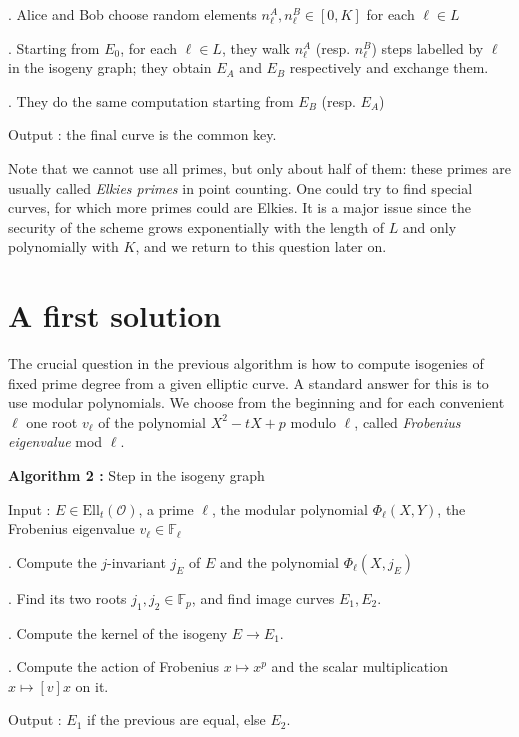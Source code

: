 \documentclass[12pt]{article}
\newcommand{\F}{\mathbb{F}}
\renewcommand{\O}{\mathcal{O}}
\newcommand{\Ell}{\mathrm{Ell}}
\begin{document}
. Alice and Bob choose random elements $n_\ell^A, n_\ell^B\in [0, K]$ for each $\ell\in L$

. Starting from $E_0$, for each $\ell\in L$, they walk $n_\ell^A$ (resp. $n_\ell^B$) steps labelled by $\ell$ in the isogeny graph; they obtain $E_A$ and $E_B$ respectively and exchange them.

. They do the same computation starting from $E_B$ (resp. $E_A$)

\noindent
Output : the final curve is the common key.
\vspace{2mm}

Note that we cannot use all primes, but only about half of them: these primes are usually called \emph{Elkies primes} in point counting. One could try to find special curves, for which more primes could are Elkies. It is a major issue since the security of the scheme grows exponentially with the length of $L$ and only polynomially with $K$, and we return to this question later on.

\section{A first solution}

The crucial question in the previous algorithm is how to compute isogenies of fixed prime degree from a given elliptic curve. A standard answer for this is to use modular polynomials. We choose from the beginning and for each convenient $\ell$ one root $v_\ell$ of the polynomial $X^2 - tX + p$ modulo $\ell$, called \emph{Frobenius eigenvalue} mod $\ell.$

\vspace{2mm}
\textbf{Algorithm 2 :} Step in the isogeny graph

\noindent
Input : $E\in \Ell_t(\O)$, a prime $\ell$, the modular polynomial $\Phi_\ell(X, Y)$, the Frobenius eigenvalue $v_\ell\in \F_\ell$

. Compute the $j$-invariant $j_E$ of $E$ and the polynomial $\Phi_\ell(X, j_E)$

. Find its two roots $j_1, j_2\in \F_p$, and find image curves $E_1, E_2$.

. Compute the kernel of the isogeny $E \to E_1$.

. Compute the action of Frobenius $x\mapsto x^p$ and the scalar multiplication $x\mapsto [v]x$ on it.

\noindent
Output : $E_1$ if the previous are equal, else $E_2$.
\vspace{2mm}
\end{document}
